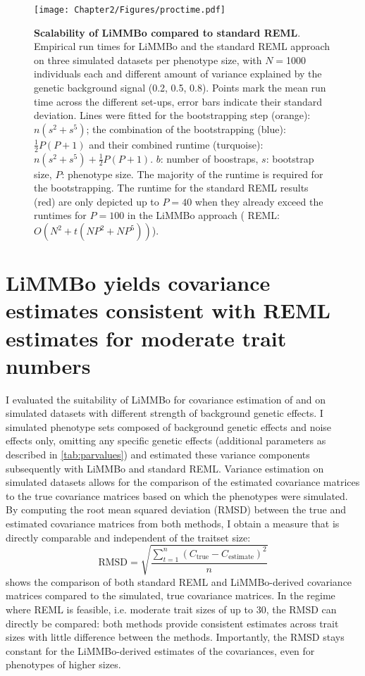 \begin{figure}[hbtp]
	\centering
	\texttt{[image: Chapter2/Figures/proctime.pdf]}
	\caption[\textbf{Scalability of LiMMBo  compared to standard REML.}]{\textbf{Scalability of LiMMBo  compared to standard REML}. Empirical run times for LiMMBo and the standard REML approach on three simulated datasets per phenotype size, with \(N=\)\num{1000} individuals each and different amount of variance explained by the genetic background signal (\num{0.2}, \num{0.5}, \num{0.8}). Points mark the mean run time across the different set-ups, error bars indicate their standard deviation. Lines were fitted for the bootstrapping step (orange): \(n(s^2 + s^5)\); the combination of the bootstrapping (blue): \(\frac{1}{2}P(P+1)\) and their combined runtime (turquoise):  \(n(s^2 + s^5) + \frac{1}{2}P(P+1)\). \(b\): number of boostraps, \(s\): bootstrap size, \(P\): phenotype size. The majority of the runtime is required for the bootstrapping. The runtime for the standard REML results (red) are only depicted up to \(P=40\) when they already exceed the runtimes for \(P=100\) in the LiMMBo approach ( REML: \(O(N^2 + t(NP^2 + NP^5))\)).}
	 	\label{fig:proctime}
\end{figure}

\section{LiMMBo yields covariance estimates consistent with REML estimates for moderate trait numbers}
\label{section:covariance-limmbo}
I evaluated the suitability of LiMMBo for covariance estimation of  and  on simulated datasets with different strength of background genetic effects. I simulated phenotype sets composed of background genetic effects  and noise effects \tmat{\Psi} only, omitting any specific genetic effects (additional parameters as described in \cref{tab:parvalues}) and estimated these variance components subsequently with LiMMBo and standard REML. Variance estimation on simulated datasets allows for the comparison of the estimated covariance matrices to the true covariance matrices based on which the phenotypes were simulated. By computing the root mean squared deviation (RMSD) between the true and estimated covariance matrices from both methods, I obtain a measure that is directly comparable and independent of the traitset size: 
\begin{equation}
\text{RMSD}=\sqrt{\frac{\sum_{t=1}^n (C_{\text{true}} - C_{\text{estimate}})^2}{n}}
\label{eq:rmsd}
\end{equation}
 shows the comparison of both standard REML and LiMMBo-derived covariance matrices compared to the simulated, true covariance matrices. In the regime where REML is feasible, i.e. moderate trait sizes of up to \num{30}, the RMSD can directly be compared: both methods provide consistent estimates across trait sizes with little difference between the methods. Importantly, the RMSD stays constant for the LiMMBo-derived estimates of the covariances, even for phenotypes of higher sizes. 

